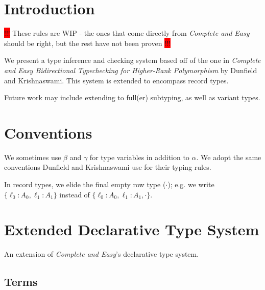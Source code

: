 \documentclass{article}
\newcommand{\consider}[1]{\colorbox{red}{!!!} #1 \colorbox{red}{!!!}}
\newcommand{\subsume}{<:}
\newcommand{\subsumes}[4]{#1 \vdash #2 \subsume #3 \dashv #4}
\begin{document}
\section{Introduction}
\consider{These rules are WIP - the ones that come directly from
  \textit{Complete and Easy} should be right, but the rest have not been proven}

We present a type inference and checking system based off of the one in
\textit{Complete and Easy Bidirectional Typechecking for Higher-Rank
  Polymorphism} by Dunfield and Krishnaswami. This system is extended to
encompass record types.

Future work may include extending to full(er) subtyping, as well as variant
types.

\section{Conventions}

We sometimes use $\beta$ and $\gamma$ for type variables in addition
to $\alpha$. We adopt the same
conventions Dunfield and Krishnaswami use for their typing rules.

In record types, we elide the final empty row type
($\cdot$); e.g. we write $\{\ell_0 : A_0, \ell_1 : A_1\}$ instead of $\{\ell_0 : A_0, \ell_1 : A_1, \cdot\}$.



\section{Extended Declarative Type System}
An extension of \emph{Complete and Easy}'s declarative type system.

\subsection{Terms}
\end{document}
